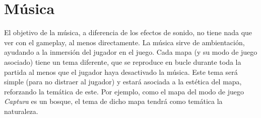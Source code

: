 
\section{Música}
El objetivo de la música, a diferencia de los efectos de sonido, no tiene nada que ver con el gameplay, al menos directamente. La música sirve de ambientación, ayudando a la inmersión del jugador en el juego. Cada mapa (y su modo de juego asociado) tiene un tema diferente, que se reproduce en bucle durante toda la partida al menos que el jugador haya desactivado la música. Este tema será simple (para no distraer al jugador) y estará asociada a la estética del mapa, reforzando la temática de este. Por ejemplo, como el mapa del modo de juego \emph{Captura} es un bosque, el tema de dicho mapa tendrá como temática la naturaleza.
